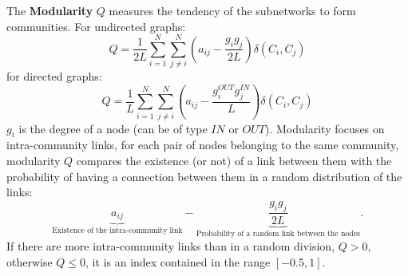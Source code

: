 \documentclass[10pt, letterpaper]{report}
\begin{document}
The \textbf{Modularity} $Q$ measures the tendency of the subnetworks to form communities. For undirected graphs:\begin{equation}
     Q=\frac{1}{2L}\sum_{i=1}^{N}
     \sum_{j\ne i}^{N}\left(
          a_{ij}-\frac{g_ig_j}{2L}  \right)\delta(C_i,C_j)
\end{equation}
for directed graphs:
\begin{equation}
     Q=\frac{1}{L}\sum_{i=1}^{N}
     \sum_{j\ne i}^{N}\left(
          a_{ij}-\frac{g_i^{OUT}g_j^{IN}}{L}  \right)\delta(C_i,C_j)
\end{equation}
$g_i$ is the degree of a node  (can be of type $IN$ or $OUT$). Modularity focuses on intra-community links, for each pair of nodes belonging to the same community, modularity $Q$ compares the
existence (or not) of a link between them with the probability of having a connection between them in a random distribution of the links:\begin{equation}
    \underbrace{ a_{ij}}_{\text{Existence of the
intra-community link}}-\underbrace{\frac{g_ig_j}{2L}}_{\text{Probability of a random link
between the nodes}}.
\end{equation}
If there are more intra-community links than in a random division, $Q>0$, otherwise $Q\le 0$, it is an index contained in the range $[-0.5,1]$. \bigskip
\end{document}
